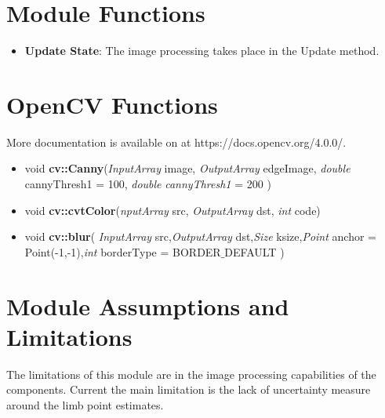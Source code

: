 

\section{Module Functions}

\begin{itemize}
	\item \textbf{Update State}: The image processing takes place in the Update method.
\end{itemize}


\section{OpenCV Functions}

More documentation is available on at https://docs.opencv.org/4.0.0/.
\begin{itemize}
	\item void \textbf{cv::Canny}(\textit{InputArray} 	image, \textit{OutputArray} 	edgeImage, \textit{double} 	cannyThresh1 = 100, \textit{double} 	\textit{cannyThresh1} = 200 )	
	\item void  \textbf{cv::cvtColor}(\textit{nputArray} 	src, \textit{OutputArray} 	dst, \textit{int} 	code)
	\item void \textbf{cv::blur}(	\textit{InputArray} 	src,\textit{OutputArray}	dst,\textit{Size} 	ksize,\textit{Point} 	anchor = Point(-1,-1),\textit{int} 	borderType = BORDER$\_$DEFAULT )	
\end{itemize}

\section{Module Assumptions and Limitations}
The limitations of this module are in the image processing capabilities of the components.
Current the main limitation is the lack of uncertainty measure around the limb point estimates.